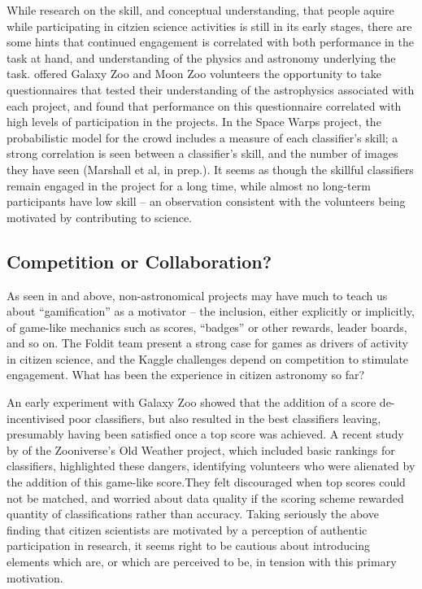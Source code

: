 \documentclass{ar2e}
\begin{document}
While research on the skill, and conceptual understanding, that  people aquire
while participating in citzien science activities is still in its early stages,
there are some hints that continued engagement is correlated with both
performance in the task at hand, and understanding of the physics and astronomy
underlying the task. \citet{Prather++2013} offered Galaxy Zoo and Moon Zoo
volunteers the opportunity to take questionnaires that tested their
understanding of the astrophysics associated with each project, and found that
performance on this questionnaire correlated with high levels of participation
in the projects. In the Space Warps project, the probabilistic model for the
crowd includes a measure of each classifier's skill; a strong correlation is
seen between a classifier's skill, and the number of images they have seen
(Marshall et al, in prep.). It seems as though the skillful classifiers remain
engaged in the project for a long time, while almost no long-term participants
have low skill -- an observation consistent with the volunteers being motivated
by contributing to science.



\subsection{Competition or Collaboration?}
\label{sec:crowd:gamification}

As seen in  and   above,
non-astronomical projects may have much to teach us about ``gamification'' as a
motivator -- the inclusion, either explicitly or implicitly, of game-like
mechanics such as scores, ``badges'' or other rewards, leader boards, and so on.
The Foldit team present a strong case for games as drivers of activity in
citizen science, and the Kaggle challenges depend on competition to stimulate
engagement. What has been the experience in citizen astronomy so far?

An early experiment with Galaxy Zoo showed that the addition of a score
de-incentivised poor classifiers, but also resulted in the best classifiers
leaving, presumably having been satisfied once a top score was achieved. A
recent study by \citep{Eveleigh++2013} of the Zooniverse's Old Weather
project, which included basic rankings for classifiers, highlighted these
dangers, identifying volunteers who were alienated by the addition of this
game-like score.They felt discouraged when top scores could not be matched, and
worried about data quality if the scoring scheme rewarded quantity of
classifications rather than accuracy. Taking seriously the above finding  that
citizen scientists are motivated by a perception of authentic participation in
research, it seems right to be cautious about introducing elements which are, or
which are perceived to be, in tension with this primary motivation. 
\end{document}
